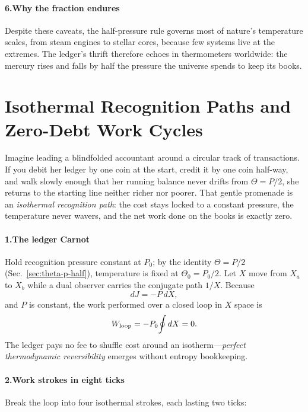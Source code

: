 \documentclass[11pt,oneside]{book}
\begin{document}
\paragraph*{6.\;Why the fraction endures}

Despite these caveats, the half-pressure rule governs most of nature’s
temperature scales, from steam engines to stellar cores, because few
systems live at the extremes.  The ledger’s thrift therefore echoes in
thermometers worldwide: the mercury rises and falls by half the
pressure the universe spends to keep its books.

\section{Isothermal Recognition Paths and Zero-Debt Work Cycles}
\label{sec:isothermal-work}

Imagine leading a blindfolded accountant around a circular track of transactions.  
If you debit her ledger by one coin at the start, credit it by one coin half-way, and walk slowly enough that her running balance never drifts from \(\Theta = P/2\), she returns to the starting line neither richer nor poorer.  
That gentle promenade is an \emph{isothermal recognition path}: the cost stays locked to a constant pressure, the temperature never wavers, and the net work done on the books is exactly zero.

\paragraph*{1.\;The ledger Carnot}

Hold recognition pressure constant at \(P_0\); by the identity
\(\Theta=P/2\) (Sec.~\ref{sec:theta-p-half}), temperature is fixed at
\(\Theta_0 = P_0/2\).  
Let \(X\) move from \(X_a\) to \(X_b\) while a dual observer carries the
conjugate path \(1/X\).  
Because
\[
  dJ = -P\,dX,
\]
and \(P\) is constant, the work performed over a closed loop in \(X\)
space is
\[
  W_{\rm loop} = -P_0\!\oint dX = 0.
\]
The ledger pays no fee to shuffle cost around an isotherm—\emph{perfect
thermodynamic reversibility} emerges without entropy bookkeeping.

\paragraph*{2.\;Work strokes in eight ticks}

Break the loop into four isothermal strokes, each lasting two ticks:
\end{document}
